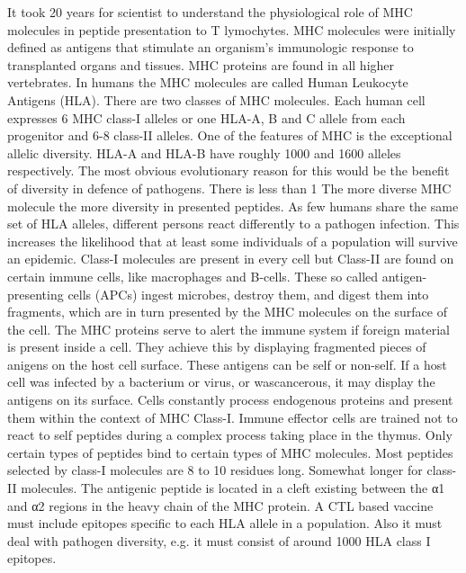 
It took 20 years for scientist to understand the  physiological role of MHC molecules in peptide presentation to T lymochytes. 
MHC molecules were initially defined as antigens that stimulate an organism’s immunologic response to transplanted organs and tissues. MHC proteins are found in all higher vertebrates. 
In humans the MHC molecules are called Human Leukocyte Antigens (HLA).
There are two classes of MHC molecules. Each human cell expresses 6 MHC class-I alleles or one HLA-A, B and C allele from each progenitor and 6-8 class-II alleles.
One of the features of MHC is the exceptional allelic diversity. HLA-A and HLA-B have roughly 1000 and 1600 alleles respectively. 
The most obvious evolutionary reason for this would be the benefit of diversity in defence of pathogens. 
There is less than 1%
The more diverse MHC molecule the more diversity in presented peptides. As few humans share the same set of HLA alleles, different persons react differently to a pathogen infection. 
This increases the likelihood that at least some individuals of a population will survive an epidemic.
Class-I molecules are present in every cell but Class-II are found on certain immune cells, like macrophages and B-cells. 
These so called antigen-presenting cells (APCs) ingest microbes, destroy them, and digest them into fragments, which are in turn presented by the MHC molecules on the surface of the cell.
The MHC proteins serve to alert the immune system if foreign material is present inside a cell. 
They achieve this by displaying fragmented pieces of anigens on the host cell surface. These antigens can be self or non-self. 
If a host cell was infected by a bacterium or virus, or wascancerous, it may  display the antigens on its surface.
Cells constantly process endogenous proteins and present them within the context of MHC Class-I. 
Immune effector cells are trained not to react to self peptides during a complex process taking place in the thymus.
Only certain types of peptides bind to certain types of MHC molecules. Most peptides selected by class-I molecules are 8 to 10 residues long. 
Somewhat longer for class-II molecules. The antigenic peptide is located in a cleft existing between the α1 and α2 regions in the heavy chain of the MHC protein.
A CTL based vaccine must include epitopes specific to each HLA allele in a population. Also it must deal with pathogen diversity, e.g. it must consist of around 1000 HLA class I epitopes. 
